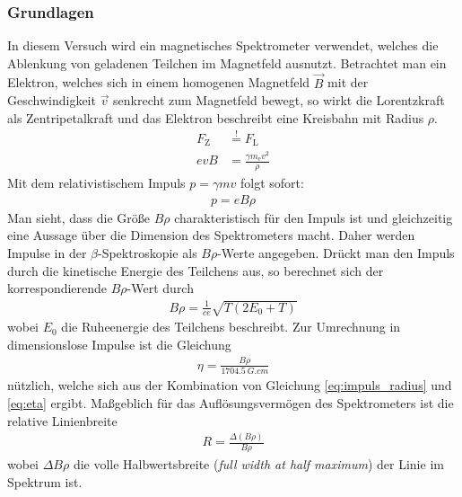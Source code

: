 \documentclass[11pt, a4paper]{article}
\numberwithin{equation}{section}
\begin{document}
\subsubsection{Grundlagen}
In diesem Versuch wird ein magnetisches Spektrometer verwendet, welches die Ablenkung von geladenen Teilchen im Magnetfeld ausnutzt.
Betrachtet man ein Elektron, welches sich in einem homogenen Magnetfeld $\vec{B}$ mit der Geschwindigkeit $\vec{v}$ senkrecht zum Magnetfeld bewegt, so wirkt die Lorentzkraft als Zentripetalkraft und das Elektron beschreibt eine Kreisbahn mit Radius $\rho$.
\begin{align*}
	F_\mathrm{Z} &\stackrel{!}{=} F_\mathrm{L} \\
	e v B &= \frac{\gamma m_\mathrm{e} v^2}{\rho}
\end{align*}
Mit dem relativistischem Impuls $p = \gamma m v$ folgt sofort:
\begin{align}
	p = e B \rho
	\label{eq:impuls_radius}
\end{align}
Man sieht, dass die Größe $B \rho$ charakteristisch für den Impuls ist und gleichzeitig eine Aussage über die Dimension des Spektrometers macht.
Daher werden Impulse in der $\beta$-Spektroskopie als $B \rho$-Werte angegeben.
Drückt man den Impuls durch die kinetische Energie des Teilchens aus, so berechnet sich der korrespondierende $B \rho$-Wert durch
\begin{align}
B \rho = \frac{1}{c e} \sqrt{T \left( 2 E_0 + T \right)}
\label{eq:b_rho}
\end{align}
wobei $E_0$ die Ruheenergie des Teilchens beschreibt.
Zur Umrechnung in dimensionslose Impulse ist die Gleichung
\begin{align}
	\eta = \frac{B \rho}{\SI{1704.5}{G.cm}}
	\label{eq:brho_to_eta}
\end{align}
nützlich, welche sich aus der Kombination von Gleichung \eqref{eq:impuls_radius} und \eqref{eq:eta} ergibt.
Maßgeblich für das Auflösungsvermögen des Spektrometers ist die relative Linienbreite
\begin{align}
	R = \frac{\Delta (B \rho)}{B \rho}
	\label{eq:rel_linienbreite}
\end{align}
wobei $\Delta B \rho$ die volle Halbwertsbreite (\emph{full width at half maximum}) der Linie im Spektrum ist.
\end{document}
